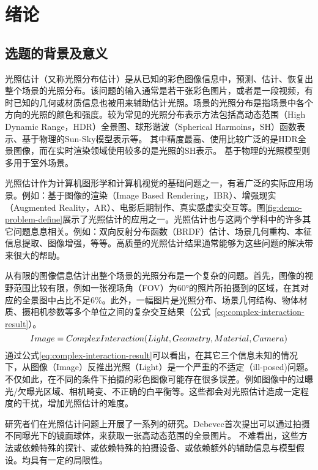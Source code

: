 \chapter{绪论}\label{chap:introduction}

\section{选题的背景及意义}
光照估计（又称光照分布估计）是从已知的彩色图像信息中，预测、估计、恢复出整个场景的光照分布。该问题的输入通常是若干张彩色图片，或者是一段视频，有时已知的几何或材质信息也被用来辅助估计光照。场景的光照分布是指场景中各个方向的光照的颜色和强度。较为常见的光照分布表示方法包括高动态范围（High Dynamic Range，HDR）全景图、球形谐波（Spherical Harmoins，SH）函数表示、基于物理的Sun-Sky模型表示等。
其中精度最高、使用比较广泛的是HDR全景图像，而在实时渲染领域使用较多的是光照的SH表示。 基于物理的光照模型则多用于室外场景。

光照估计作为计算机图形学和计算机视觉的基础问题之一，有着广泛的实际应用场景。例如：基于图像的渲染（Image Based Rendering，IBR）、增强现实（Augmented Reality，AR）、电影后期制作、真实感虚实交互等。图\ref{fig:demo-problem-define}展示了光照估计的应用之一。光照估计也与这两个学科中的许多其它问题息息相关。例如：双向反射分布函数（BRDF）估计、场景几何重构、本征信息提取、图像增强，等等。高质量的光照估计结果通常能够为这些问题的解决带来很大的帮助。 

从有限的图像信息估计出整个场景的光照分布是一个复杂的问题。首先，图像的视野范围比较有限，例如一张视场角（FOV）为60°的照片所拍摄到的区域，在其对应的全景图中占比不足6\%。此外，一幅图片是光照分布、场景几何结构、物体材质、摄相机参数等多个单位之间的复杂交互结果（公式~\ref{eq:complex-interaction-result}）。
\begin{equation} \centering 
    \label{eq:complex-interaction-result}
    Image = ComplexInteraction(Light, Geometry, Material, Camera)
\end{equation}
通过公式\ref{eq:complex-interaction-result}可以看出，在其它三个信息未知的情况下，从图像（Image）反推出光照（Light）是一个严重的不适定（ill-posed)问题。不仅如此，在不同的条件下拍摄的彩色图像可能存在很多误差。例如图像中的过曝光/欠曝光区域、相机畸变、不正确的白平衡等。这些都会对光照估计造成一定程度的干扰，增加光照估计的难度。

研究者们在光照估计问题上开展了一系列的研究。Debevec\cite{debevec1998rendering}首次提出可以通过拍摄不同曝光下的镜面球体，来获取一张高动态范围的全景图片。 不难看出，这些方法或依赖特殊的探针、或依赖特殊的拍摄设备、或依赖额外的辅助信息与模型假设。均具有一定的局限性。

